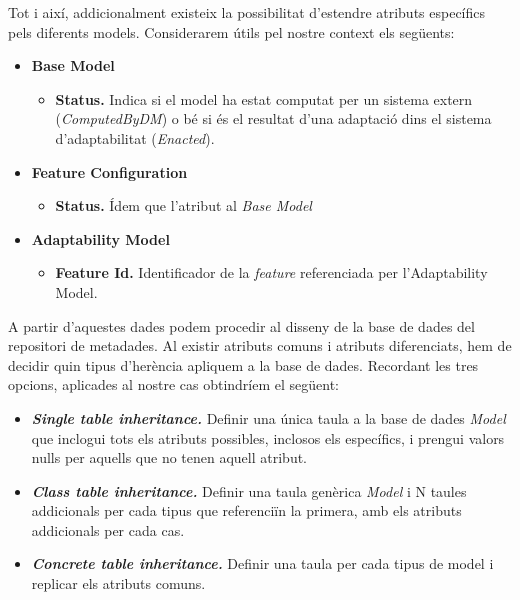 Tot i així, addicionalment existeix la possibilitat d'estendre atributs específics pels diferents models. Considerarem útils pel nostre context els següents:

\begin{itemize}
\item \textbf{Base Model}
\begin{itemize}
\item \textbf{Status.} Indica si el model ha estat computat per un sistema extern (\textit{ComputedByDM}) o bé si és el resultat d'una adaptació dins el sistema d'adaptabilitat (\textit{Enacted}).
\end{itemize}
\item \textbf{Feature Configuration}
\begin{itemize}
\item \textbf{Status.} Ídem que l'atribut al \textit{Base Model}
\end{itemize}
\item \textbf{Adaptability Model}
\begin{itemize}
\item \textbf{Feature Id.} Identificador de la \textit{feature} referenciada per l'Adaptability Model.
\end{itemize}
\end{itemize}

A partir d'aquestes dades podem procedir al disseny de la base de dades del repositori de metadades. Al existir atributs comuns i atributs diferenciats, hem de decidir quin tipus d'herència apliquem a la base de dades. Recordant les tres opcions, aplicades al nostre cas obtindríem el següent:

\begin{itemize}
\item \textbf{\textit{Single table inheritance.}} Definir una única taula a la base de dades \textit{Model} que inclogui tots els atributs possibles, inclosos els específics, i prengui valors nulls per aquells que no tenen aquell atribut.
\item \textbf{\textit{Class table inheritance.}} Definir una taula genèrica \textit{Model} i N taules addicionals per cada tipus que referenciïn la primera, amb els atributs addicionals per cada cas.
\item \textbf{\textit{Concrete table inheritance.}} Definir una taula per cada tipus de model i replicar els atributs comuns.
\end{itemize}

